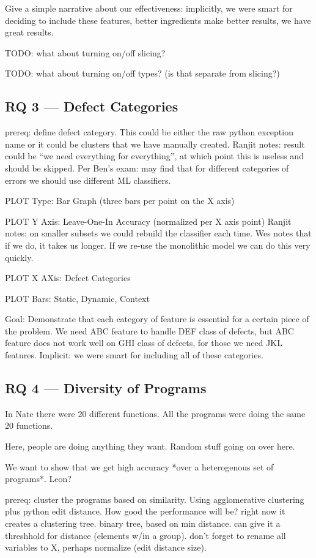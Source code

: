 \documentclass[conference]{IEEEtran}
\begin{document}
Give a simple narrative about our effectiveness: implicitly, we were smart
for deciding to include these features, better ingredients make better
results, we have great results.

TODO: what about turning on/off slicing?

TODO: what about turning on/off types? (is that separate from slicing?)

\subsection{RQ 3 --- Defect Categories}

prereq: define defect category. This could be either the raw python
exception name or it could be clusters that we have manually created.
Ranjit notes: result could be ``we need everything for everything'', at
which point this is useless and should be skipped. Per Ben's exam: may find
that for different categories of errors we should use different ML
classifiers.

PLOT Type: Bar Graph (three bars per point on the X axis)

PLOT Y Axis: Leave-One-In Accuracy (normalized per X axis point)
Ranjit notes: on smaller subsets we could rebuild the classifier each time.
Wes notes that if we do, it takes us longer. If we re-use the monolithic
model we can do this very quickly.

PLOT X AXis: Defect Categories

PLOT Bars: Static, Dynamic, Context

Goal: Demonstrate that each category of feature is essential for a certain
piece of the problem. We need ABC feature to handle DEF class of defects,
but ABC feature does not work well on GHI class of defects, for those we
need JKL features. Implicit: we were smart for including all of these
categories.

\subsection{RQ 4 --- Diversity of Programs}

In Nate there were 20 different functions. All the programs were doing the
same 20 functions.

Here, people are doing anything they want. Random stuff going on over here.

We want to show that we get high accuracy *over a heterogenous set of
programs*. Leon?

prereq: cluster the programs based on similarity. Using agglomerative
clustering plus python edit distance. How good the performance will be?
right now it creates a clustering tree. binary tree, based on min distance.
can give it a threshhold for distance (elements w/in a group). don't forget
to rename all variables to X, perhaps normalize (edit distance size).
\end{document}
